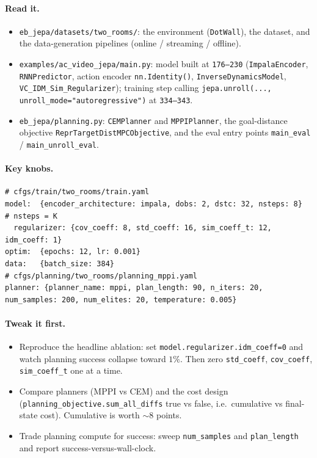 \documentclass{article}
\newcommand{\code}[1]{\texttt{\small #1}}
\newcommand{\file}[1]{\texttt{\small #1}}
\begin{document}
\paragraph{Read it.}
\begin{itemize}[leftmargin=1.4em,itemsep=1pt,topsep=2pt]
  \item \file{eb\_jepa/datasets/two\_rooms/}: the environment (\code{DotWall}), the
    dataset, and the data-generation pipelines (online / streaming / offline).
  \item \file{examples/ac\_video\_jepa/main.py}: model built at \code{176--230}
    (\code{ImpalaEncoder}, \code{RNNPredictor}, action encoder
    \code{nn.Identity()}, \code{InverseDynamicsModel}, \code{VC\_IDM\_Sim\_Regularizer});
    training step calling \code{jepa.unroll(..., unroll\_mode="autoregressive")} at
    \code{334--343}.
  \item \file{eb\_jepa/planning.py}: \code{CEMPlanner} and \code{MPPIPlanner}, the
    goal-distance objective \code{ReprTargetDistMPCObjective}, and the eval entry
    points \code{main\_eval} / \code{main\_unroll\_eval}.
\end{itemize}

\paragraph{Key knobs.}
\begin{lstlisting}[style=yml]
# cfgs/train/two_rooms/train.yaml
model:  {encoder_architecture: impala, dobs: 2, dstc: 32, nsteps: 8}  # nsteps = K
  regularizer: {cov_coeff: 8, std_coeff: 16, sim_coeff_t: 12, idm_coeff: 1}
optim:  {epochs: 12, lr: 0.001}
data:   {batch_size: 384}
# cfgs/planning/two_rooms/planning_mppi.yaml
planner: {planner_name: mppi, plan_length: 90, n_iters: 20, num_samples: 200, num_elites: 20, temperature: 0.005}
\end{lstlisting}

\paragraph{Tweak it first.}
\begin{itemize}[leftmargin=1.4em,itemsep=1pt,topsep=2pt]
  \item Reproduce the headline ablation: set \code{model.regularizer.idm\_coeff=0}
    and watch planning success collapse toward $1\%$. Then zero
    \code{std\_coeff}, \code{cov\_coeff}, \code{sim\_coeff\_t} one at a time.
  \item Compare planners (MPPI vs CEM) and the cost design
    (\code{planning\_objective.sum\_all\_diffs} true vs false, i.e.\ cumulative vs
    final-state cost). Cumulative is worth $\sim$8 points.
  \item Trade planning compute for success: sweep \code{num\_samples} and
    \code{plan\_length} and report success-versus-wall-clock.
\end{itemize}
\end{document}
